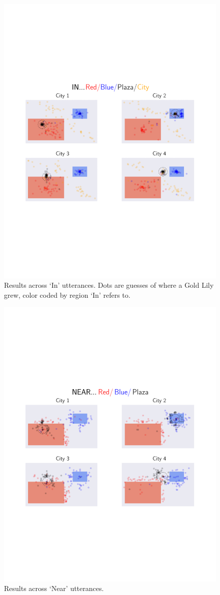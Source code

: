 \documentclass[10pt,letterpaper]{article}
\begin{document}
\begin{figure}[!t]
\center
\includegraphics[width=.82\textwidth]{figures/In.pdf}
\caption{Results across `In' utterances. Dots are guesses of where a Gold Lily grew, color coded by region `In' refers to.}
\label{fig:In}
\end{figure}

\begin{figure}[!]
\center
\includegraphics[width=.82\textwidth]{figures/Near.pdf}
\caption{Results across `Near' utterances.}
\label{fig:Near}
\end{figure}
\end{document}
